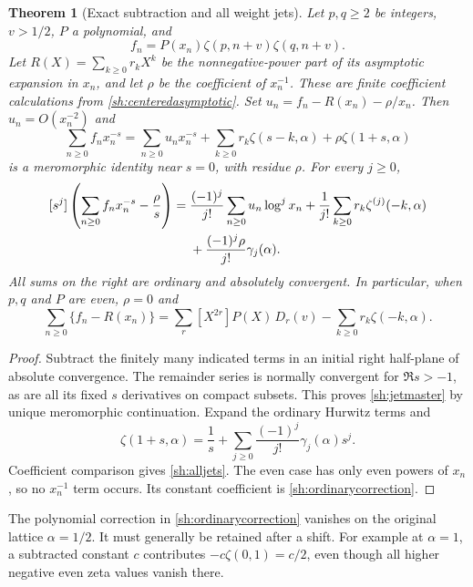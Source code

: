 \documentclass[11pt]{article}
\newtheorem{theorem}{Theorem}[section]
\theoremstyle{definition}
\theoremstyle{remark}
\numberwithin{equation}{section}
\begin{document}
\begin{theorem}[Exact subtraction and all weight jets]\label{sh:jets}
Let $p,q\ge2$ be integers, $v>1/2$, $P$ a polynomial, and
\[
 f_n=P(x_n)\zeta(p,n+v)\zeta(q,n+v).
\]
Let $R(X)=\sum_{k\ge0}r_kX^k$ be the nonnegative-power part of
its asymptotic expansion in $x_n$, and let $\rho$ be the coefficient
of $x_n^{-1}$.  These are finite coefficient calculations from
\eqref{sh:centeredasymptotic}.  Set
$u_n=f_n-R(x_n)-\rho/x_n$.  Then $u_n=O(x_n^{-2})$ and
\begin{equation}\label{sh:jetmaster}
 \sum_{n\ge0}f_nx_n^{-s}
 =\sum_{n\ge0}u_nx_n^{-s}
       +\sum_{k\ge0}r_k\zeta(s-k,\alpha)
       +\rho\zeta(1+s,\alpha)
\end{equation}
is a meromorphic identity near $s=0$, with residue $\rho$.  For
every $j\ge0$,
\begin{align}\label{sh:alljets}
 [s^j]\left(\sum_{n\ge0}f_nx_n^{-s}-\frac\rho s\right)
 ={}&\frac{(-1)^j}{j!}\sum_{n\ge0}u_n\log^j x_n
     +\frac1{j!}\sum_{k\ge0}r_k\zeta^{(j)}(-k,\alpha)\notag\\
 &+\frac{(-1)^j\rho}{j!}\gamma_j(\alpha).
\end{align}
All sums on the right are ordinary and absolutely convergent.
In particular, when $p,q$ and $P$ are even, $\rho=0$ and
\begin{equation}\label{sh:ordinarycorrection}
 \boxed{\sum_{n\ge0}\{f_n-R(x_n)\}
   =\sum_r[X^{2r}]P(X)\,D_r(v)
                       -\sum_{k\ge0}r_k\zeta(-k,\alpha).}
\end{equation}
\end{theorem}

\begin{proof}
Subtract the finitely many indicated terms in an initial right
half-plane of absolute convergence.  The remainder series is normally
convergent for $\Re s>-1$, as are all its fixed $s$ derivatives
on compact subsets.  This proves \eqref{sh:jetmaster} by unique
meromorphic continuation.  Expand the ordinary Hurwitz terms and
\[
 \zeta(1+s,\alpha)=\frac1s+
       \sum_{j\ge0}\frac{(-1)^j}{j!}\gamma_j(\alpha)s^j.
\]
Coefficient comparison gives \eqref{sh:alljets}.  The even case has
only even powers of $x_n$, so no $x_n^{-1}$ term occurs.  Its
constant coefficient is \eqref{sh:ordinarycorrection}.
\end{proof}

The polynomial correction in \eqref{sh:ordinarycorrection} vanishes
on the original lattice $\alpha=1/2$.  It must generally be retained
after a shift.  For example at $\alpha=1$, a subtracted constant
$c$ contributes $-c\zeta(0,1)=c/2$, even though all higher
negative even zeta values vanish there.
\end{document}

